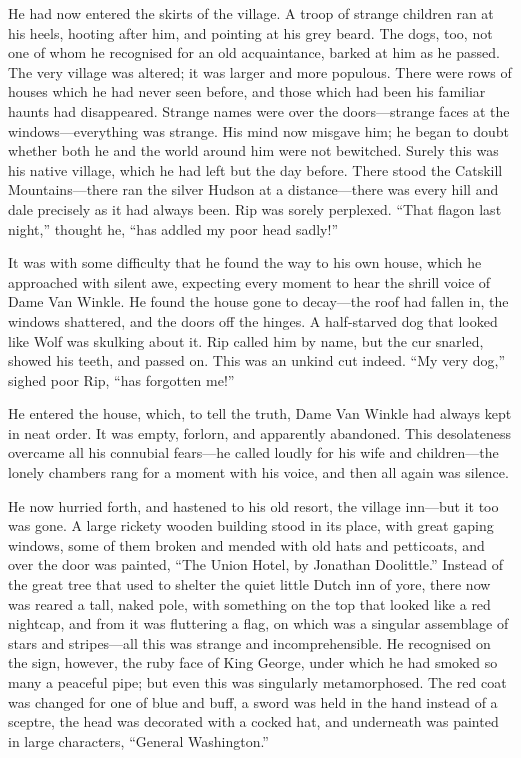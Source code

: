 He had now entered the skirts of the village. A troop of strange children ran at his heels, hooting after him, and pointing at his grey beard. The dogs, too, not one of whom he recognised for an old acquaintance, barked at him as he passed. The very village was altered; it was larger and more populous. There were rows of houses which he had never seen before, and those which had been his familiar haunts had disappeared. Strange names were over the doors—strange faces at the windows—everything was strange. His mind now misgave him; he began to doubt whether both he and the world around him were not bewitched. Surely this was his native village, which he had left but the day before. There stood the Catskill Mountains—there ran the silver Hudson at a distance—there was every hill and dale precisely as it had always been. Rip was sorely perplexed. “That flagon last night,” thought he, “has addled my poor head sadly!”

It was with some difficulty that he found the way to his own house, which he approached with silent awe, expecting every moment to hear the shrill voice of Dame Van Winkle. He found the house gone to decay—the roof had fallen in, the windows shattered, and the doors off the hinges. A half-starved dog that looked like Wolf was skulking about it. Rip called him by name, but the cur snarled, showed his teeth, and passed on. This was an unkind cut indeed. “My very dog,” sighed poor Rip, “has forgotten me!”

He entered the house, which, to tell the truth, Dame Van Winkle had always kept in neat order. It was empty, forlorn, and apparently abandoned. This desolateness overcame all his connubial fears—he called loudly for his wife and children—the lonely chambers rang for a moment with his voice, and then all again was silence.

He now hurried forth, and hastened to his old resort, the village inn—but it too was gone. A large rickety wooden building stood in its place, with great gaping windows, some of them broken and mended with old hats and petticoats, and over the door was painted, “The Union Hotel, by Jonathan Doolittle.” Instead of the great tree that used to shelter the quiet little Dutch inn of yore, there now was reared a tall, naked pole, with something on the top that looked like a red nightcap, and from it was fluttering a flag, on which was a singular assemblage of stars and stripes—all this was strange and incomprehensible. He recognised on the sign, however, the ruby face of King George, under which he had smoked so many a peaceful pipe; but even this was singularly metamorphosed. The red coat was changed for one of blue and buff, a sword was held in the hand instead of a sceptre, the head was decorated with a cocked hat, and underneath was painted in large characters, “General Washington.”

